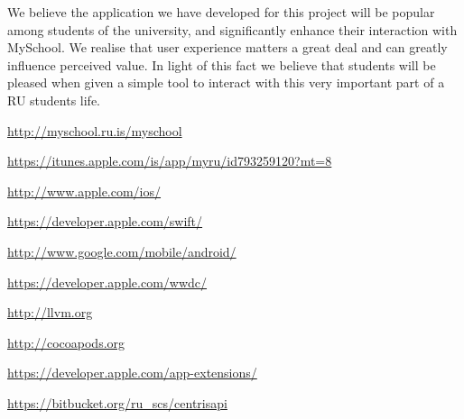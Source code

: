 \documentclass[pdftex, DIV=calc, paper=a4, fontsize=11pt]{scrartcl}	 %
\begin{document}
We believe the application we have
developed for this project will be popular among students of the university, and significantly
enhance their interaction with MySchool. We realise that user experience matters a great deal and
can greatly influence perceived value. In light of this fact we believe that students will be pleased
when given a simple tool to interact with this very important part of a RU students life.

\pagebreak


\begin{thebibliography}{9}

    \url{http://myschool.ru.is/myschool}

    \url{https://itunes.apple.com/is/app/myru/id793259120?mt=8}

    \url{http://www.apple.com/ios/}

    \url{https://developer.apple.com/swift/}

    \url{http://www.google.com/mobile/android/}
    
    \url{https://developer.apple.com/wwdc/}

    \url{http://llvm.org}

    \url{http://cocoapods.org}

    \url{https://developer.apple.com/app-extensions/}

    \url{https://bitbucket.org/ru_scs/centrisapi}

\end{thebibliography}

\end{document}
